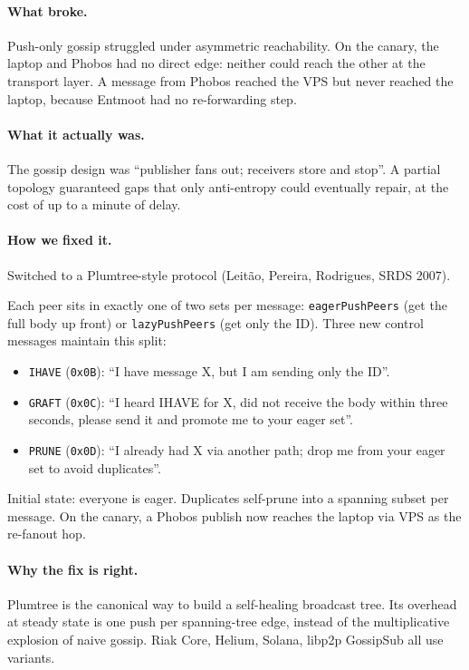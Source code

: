 \documentclass[11pt,a4paper]{article}
\begin{document}
\paragraph{What broke.} Push-only gossip struggled under
asymmetric reachability. On the canary, the laptop and Phobos
had no direct edge: neither could reach the other at the
transport layer. A message from Phobos reached the VPS but
never reached the laptop, because Entmoot had no re-forwarding
step.

\paragraph{What it actually was.} The gossip design was
``publisher fans out; receivers store and stop''. A partial
topology guaranteed gaps that only anti-entropy could eventually
repair, at the cost of up to a minute of delay.

\paragraph{How we fixed it.} Switched to a Plumtree-style
protocol (Leit\~ao, Pereira, Rodrigues, SRDS 2007).

Each peer sits in exactly one of two sets per message:
\texttt{eagerPushPeers} (get the full body up front) or
\texttt{lazyPushPeers} (get only the ID). Three new control
messages maintain this split:

\begin{itemize}[leftmargin=1.2em]
    \item \texttt{IHAVE} (\texttt{0x0B}): ``I have message X, but
    I am sending only the ID''.
    \item \texttt{GRAFT} (\texttt{0x0C}): ``I heard IHAVE for X,
    did not receive the body within three seconds, please send
    it and promote me to your eager set''.
    \item \texttt{PRUNE} (\texttt{0x0D}): ``I already had X via
    another path; drop me from your eager set to avoid
    duplicates''.
\end{itemize}

Initial state: everyone is eager. Duplicates self-prune into a
spanning subset per message. On the canary, a Phobos publish now
reaches the laptop via VPS as the re-fanout hop.

\paragraph{Why the fix is right.} Plumtree is the canonical way
to build a self-healing broadcast tree. Its overhead at steady
state is one push per spanning-tree edge, instead of the
multiplicative explosion of naive gossip. Riak Core, Helium,
Solana, libp2p GossipSub all use variants.
\end{document}
